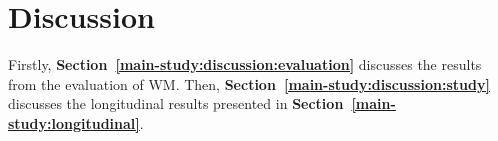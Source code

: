 
\newpage
\section{Discussion}
\label{main-study:discussion}
Firstly,  \textbf{Section~\ref{main-study:discussion:evaluation}} discusses the results from the evaluation of WM.  Then, \textbf{Section~\ref{main-study:discussion:study}} discusses the longitudinal results presented in  \textbf{Section~\ref{main-study:longitudinal}}.

